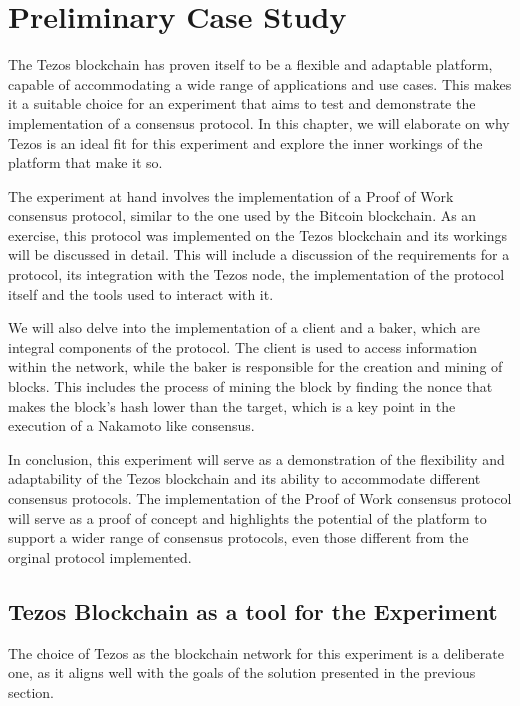 \chapter{Preliminary Case Study}

The Tezos blockchain has proven itself to be a flexible and adaptable platform, capable of accommodating a wide range of applications and use cases. This makes it a suitable choice for an experiment that aims to test and demonstrate the implementation of a consensus protocol. In this chapter, we will elaborate on why Tezos is an ideal fit for this experiment and explore the inner workings of the platform that make it so.

The experiment at hand involves the implementation of a Proof of Work consensus protocol, similar to the one used by the Bitcoin blockchain.
As an exercise, this protocol was implemented on the Tezos blockchain and its workings will be discussed in detail. This will include a discussion of the requirements for a protocol, its integration with the Tezos node, the implementation of the protocol itself and the tools used to interact with it.

We will also delve into the implementation of a client and a baker, which are integral components of the protocol. The client is used to access information within the network, while the baker is responsible for the creation and mining of blocks. This includes the process of mining the block by finding the nonce that makes the block's hash lower than the target, which is a key point in the execution of a Nakamoto like consensus.

In conclusion, this experiment will serve as a demonstration of the flexibility and adaptability of the Tezos blockchain and its ability to accommodate different consensus protocols. The implementation of the Proof of Work consensus protocol will serve as a proof of concept and highlights the potential of the platform to support a wider range of consensus protocols, even those different from the orginal protocol implemented.

\section{Tezos Blockchain as a tool for the Experiment}
The choice of Tezos as the blockchain network for this experiment is a deliberate one, as it aligns well with the goals of the solution presented in the previous section.

